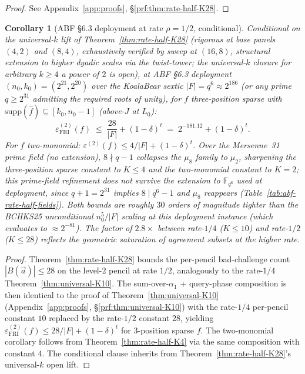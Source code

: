 \documentclass[11pt]{article}
\newtheorem{corollary}[theorem]{Corollary}
\theoremstyle{definition}
\theoremstyle{remark}
\newcommand{\FF}{\mathbb{F}}
\begin{document}
\begin{proof}[Proof] See Appendix~\ref{app:proofs}, \S\ref{prf:thm:rate-half-K28}.\end{proof}

\begin{corollary}[ABF \S 6.3 deployment at rate $\rho = 1/2$, conditional]
\label{cor:abf-K28-rate-half}
Conditional on the universal-$k$ lift of Theorem~\ref{thm:rate-half-K28}
(rigorous at base panels $(4, 2)$ and $(8, 4)$, exhaustively verified
by sweep at $(16, 8)$, structural extension to higher dyadic scales
via the twist-tower; the universal-$k$ closure for arbitrary
$k \geq 4$ a power of $2$ is open),
at ABF \S 6.3 deployment
$(n_0, k_0) = (2^{21}, 2^{20})$ over the
KoalaBear sextic $|F| = q^6 \approx 2^{186}$ (or any prime $q \geq 2^{31}$
admitting the required roots of unity), for $f$ three-position sparse
with $\mathrm{supp}(\hat f) \subseteq [k_0, n_0 - 1]$ (above-$J$ at $L_0$):
\[
 \varepsilon_{\mathrm{FRI}}^{(2)}(f) \;\leq\; \frac{28}{|F|} + (1-\delta)^t
 \;=\; 2^{-181.12} + (1-\delta)^t.
\]
For $f$ two-monomial: $\varepsilon^{(2)}(f) \leq 4/|F| + (1-\delta)^t$.
Over the Mersenne~31 \emph{prime} field (no extension), $8 \nmid q-1$
collapses the $\mu_8$ family to $\mu_2$, sharpening the three-position
sparse constant to $K \leq 4$ and the two-monomial constant to $K = 2$;
this prime-field refinement does not survive the extension to
$\FF_{q^6}$ used at deployment, since $q + 1 = 2^{31}$ implies
$8 \mid q^6-1$ and $\mu_8$ reappears
(Table~\ref{tab:abf-rate-half-fields}).
Both bounds are roughly $30$ orders of magnitude tighter than the
BCHKS25 unconditional $n_0^5/|F|$ scaling at this deployment instance
(which evaluates to $\approx 2^{-81}$). The factor of $2.8\times$
between rate-$1/4$ ($K \leq 10$) and rate-$1/2$ ($K \leq 28$) reflects the
geometric saturation of agreement subsets at the higher rate.
\end{corollary}

\begin{proof}
Theorem~\ref{thm:rate-half-K28} bounds the per-pencil bad-challenge
count $|B(\vec a)| \leq 28$ on the level-$2$ pencil at rate $1/2$,
analogously to the rate-$1/4$ Theorem~\ref{thm:universal-K10}. The
sum-over-$\alpha_1$ + query-phase composition is then identical to
the proof of Theorem~\ref{thm:universal-K10}
(Appendix~\ref{app:proofs}, \S\ref{prf:thm:universal-K10}) with the
rate-$1/4$ per-pencil constant $10$ replaced by the rate-$1/2$
constant $28$, yielding $\varepsilon_{\mathrm{FRI}}^{(2)}(f) \leq
28/|F| + (1-\delta)^t$ for $3$-position sparse $f$. The two-monomial
corollary follows from Theorem~\ref{thm:rate-half-K4} via the same
composition with constant $4$. The conditional clause inherits from
Theorem~\ref{thm:rate-half-K28}'s universal-$k$ open lift.
\end{proof}
\end{document}
